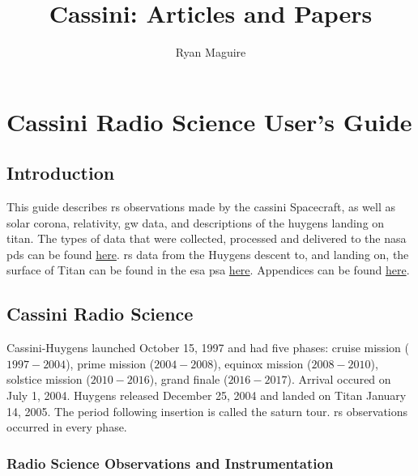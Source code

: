 \documentclass{article}
\title{Cassini: Articles and Papers}
\author{Ryan Maguire}
\date{\vspace{-5ex}}
\theoremstyle{mystyle}
\begin{document}
\maketitle
\tableofcontents
\section{Cassini Radio Science User's Guide}
%
\label{sec:usrguide}
%
\subsection{Introduction}
%
This guide describes \gls{rs} observations made by the \gls{cassini} Spacecraft, as well as \gls{solar corona}, \gls{relativity}, \gls{gw} data, and descriptions of the \gls{huygens} landing on \gls{titan}. The types of data that were collected, processed and delivered to the \gls{nasa} \gls{pds} can be found \href{http://pds-atmospheres.nmsu.edu/}{here}. \gls{rs} data from the Huygens descent to, and landing on, the surface of Titan can be found in the \gls{esa} \gls{psa} \href{https://www.cosmos.esa.int/?project=PSA&page=huygens}{here}. Appendices can be found \href{https://radioscience.jpl.nasa.gov/publications/index.html}{here}.
%
\subsection{Cassini Radio Science\label{subsec:usr_cassini_radio_science}}
%
Cassini-Huygens launched October 15, 1997 and had five phases: \Gls{cruise mission} ($1997\! -\! 2004$), \gls{prime mission} ($2004\! -\! 2008$), \gls{equinox mission} ($2008\! -\! 2010$), \gls{solstice mission} ($2010\! -\! 2016$), \gls{grand finale} ($2016\! - \!2017$). Arrival occured on July 1, 2004. Huygens released December 25, 2004 and landed on Titan January 14, 2005. The period following insertion is called the \gls{saturn tour}. \gls{rs} observations occurred in every phase.

\subsubsection{Radio Science Observations and Instrumentation\label{subsubsec:usr_rad_sci_obs_and_inst}}
\end{document}
